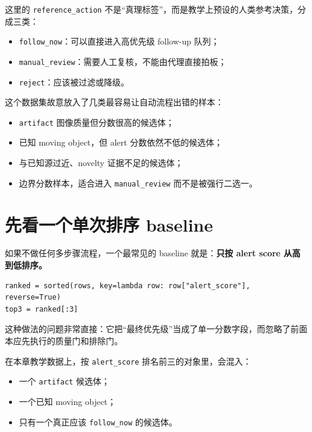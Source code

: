 这里的 \texttt{reference\_action} 不是“真理标签”，而是教学上预设的人类参考决策，分成三类：

\begin{itemize}
    \item \texttt{follow\_now}：可以直接进入高优先级 follow-up 队列；
    \item \texttt{manual\_review}：需要人工复核，不能由代理直接拍板；
    \item \texttt{reject}：应该被过滤或降级。
\end{itemize}

这个数据集故意放入了几类最容易让自动流程出错的样本：

\begin{itemize}
    \item \texttt{artifact} 图像质量但分数很高的候选体；
    \item 已知 moving object，但 alert 分数依然不低的候选体；
    \item 与已知源过近、novelty 证据不足的候选体；
    \item 边界分数样本，适合进入 \texttt{manual\_review} 而不是被强行二选一。
\end{itemize}

\section{先看一个单次排序 baseline}

如果不做任何多步骤流程，一个最常见的 baseline 就是：\textbf{只按 alert score 从高到低排序。}

\begin{examplebox}
\begin{lstlisting}[style=pythonstyle]
ranked = sorted(rows, key=lambda row: row["alert_score"], reverse=True)
top3 = ranked[:3]
\end{lstlisting}
\end{examplebox}

这种做法的问题非常直接：它把“最终优先级”当成了单一分数字段，而忽略了前面本应先执行的质量门和排除门。

在本章教学数据上，按 \texttt{alert\_score} 排名前三的对象里，会混入：

\begin{itemize}
    \item 一个 \texttt{artifact} 候选体；
    \item 一个已知 moving object；
    \item 只有一个真正应该 \texttt{follow\_now} 的候选体。
\end{itemize}

